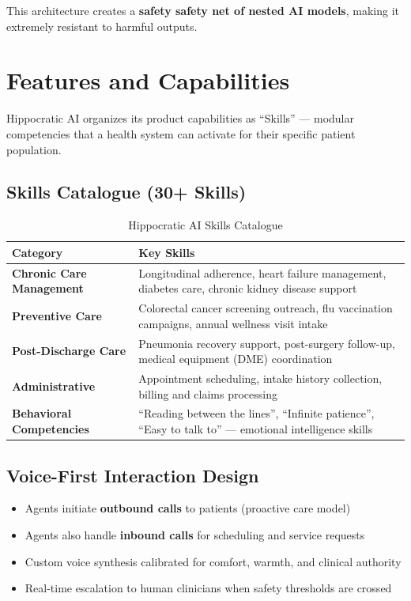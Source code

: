 \documentclass[12pt,a4paper]{article}
\begin{document}
This architecture creates a \textbf{safety safety net of nested AI models}, making it extremely resistant to harmful outputs.

\newpage

\section{Features and Capabilities}

Hippocratic AI organizes its product capabilities as ``Skills'' --- modular competencies that a health system can activate for their specific patient population.

\subsection{Skills Catalogue (30+ Skills)}

\begin{table}[H]
\centering
\renewcommand{\arraystretch}{1.3}
\begin{tabularx}{\textwidth}{lX}
\toprule
\textbf{Category} & \textbf{Key Skills} \\
\midrule
\textbf{Chronic Care Management} & Longitudinal adherence, heart failure management, diabetes care, chronic kidney disease support \\
\textbf{Preventive Care} & Colorectal cancer screening outreach, flu vaccination campaigns, annual wellness visit intake \\
\textbf{Post-Discharge Care} & Pneumonia recovery support, post-surgery follow-up, medical equipment (DME) coordination \\
\textbf{Administrative} & Appointment scheduling, intake history collection, billing and claims processing \\
\textbf{Behavioral Competencies} & ``Reading between the lines'', ``Infinite patience'', ``Easy to talk to'' --- emotional intelligence skills \\
\bottomrule
\end{tabularx}
\caption{Hippocratic AI Skills Catalogue}
\end{table}

\subsection{Voice-First Interaction Design}

\begin{itemize}[noitemsep]
    \item Agents initiate \textbf{outbound calls} to patients (proactive care model)
    \item Agents also handle \textbf{inbound calls} for scheduling and service requests
    \item Custom voice synthesis calibrated for comfort, warmth, and clinical authority
    \item Real-time escalation to human clinicians when safety thresholds are crossed
\end{itemize}
\end{document}

